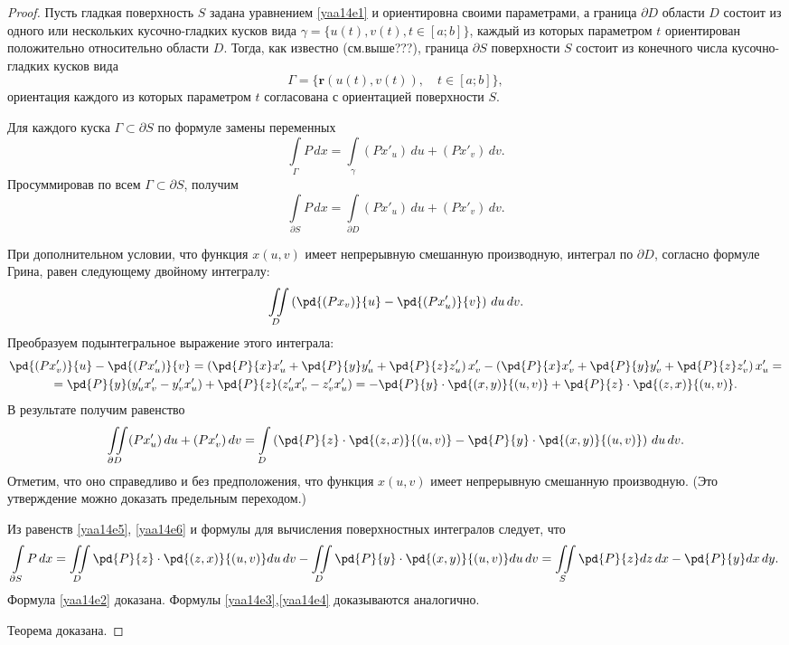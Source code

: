 \begin{proof}
Пусть гладкая поверхность $S$ задана уравнением \eqref{yaa14e1} и ориентировна своими параметрами, а граница $\partial D$ области $D$ состоит из одного или нескольких кусочно-гладких кусков вида $\gamma = \{u(t),v(t),t\in[a;b]\}$, каждый из которых параметром $t$ ориентирован положительно относительно области $D$. Тогда, как известно (см.выше???), граница $\partial S$ поверхности $S$ состоит из конечного числа кусочно-гладких кусков вида
$$
\Gamma = \{\mathbf{r}(u(t),v(t)),\quad t\in[a;b]\},
$$
ориентация каждого из которых параметром $t$ согласована с ориентацией поверхности $S$.

Для каждого куска $\Gamma\subset\partial S$ по формуле замены переменных
$$
\int\limits_{\Gamma} P\,dx = \int\limits_\gamma (Px'_u)\,du+(Px'_v)\,dv.
$$
Просуммировав по всем $\Gamma\subset\partial S$, получим
\begin{equation} \label{yaa14e5}
\int\limits_{\partial S} P\,dx = \int\limits_{\partial D} (Px'_u)\,du+(Px'_v)\,dv.
\end{equation}

При дополнительном условии, что функция $x(u,v)$ имеет непрерывную смешанную производную, интеграл по $\partial D$, согласно формуле Грина, равен следующему двойному интегралу:
$$
\iint\limits_D\left(\pd{(Px_v)}{u} -\pd{(Px'_u)}{v}\right)\,du\,dv.
$$
Преобразуем подынтегральное выражение этого интеграла:
\begin{multline*}
\pd{(Px'_v)}{u} - \pd{(Px'_u)}{v} = \left(\pd{P}{x}x'_u+\pd{P}{y}y'_u+\pd{P}{z}z'_u\right)x'_v-\left(\pd{P}{x}x'_v+\pd{P}{y}y'_v+\pd{P}{z}z'_v\right)x'_u =\\= \pd{P}{y}(y'_ux'_v-y'_vx'_u)+\pd{P}{z}(z'_ux'_v-z'_vx'_u)=-\pd{P}{y}\cdot \pd{(x,y)}{(u,v)}+\pd{P}{z}\cdot\pd{(z,x)}{(u,v)}.
\end{multline*}
В результате получим равенство
\begin{equation} \label{yaa14e6}
\iint\limits_{\partial D} (Px'_u)\,du+(Px'_v)\,dv = \int\limits_D\left(\pd{P}{z}\cdot\pd{(z,x)}{(u,v)}-\pd{P}{y}\cdot \pd{(x,y)}{(u,v)}\right)\,du\,dv.
\end{equation}
Отметим, что оно справедливо и без предположения, что функция $x(u,v)$ имеет непрерывную смешанную производную. (Это утверждение можно доказать предельным переходом.)

Из равенств \eqref{yaa14e5}, \eqref{yaa14e6} и формулы для вычисления поверхностных интегралов следует, что
$$
\int\limits_{\partial S} P\,dx = \iint\limits_D \pd{P}{z}\cdot\pd{(z,x)}{(u,v)}du\,dv -\iint\limits_D \pd{P}{y}\cdot\pd{(x,y)}{(u,v)}du\,dv = \iint\limits_S \pd{P}{z}dz\,dx-\pd{P}{y}dx\,dy.
$$
Формула \eqref{yaa14e2} доказана. Формулы \eqref{yaa14e3},\eqref{yaa14e4} доказываются аналогично.

Теорема доказана.
\end{proof}

